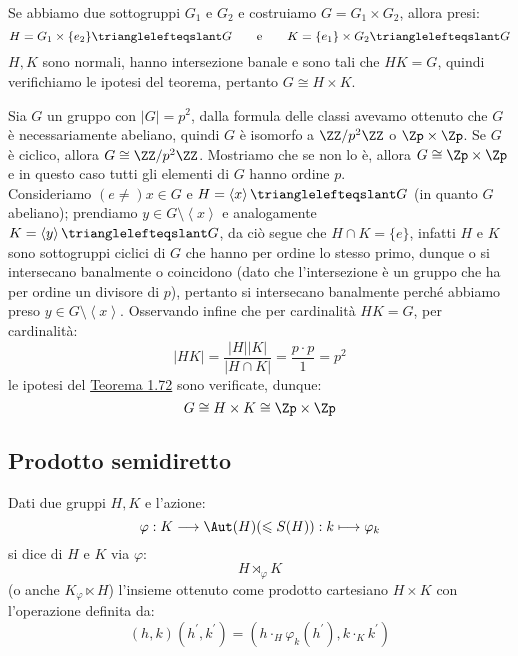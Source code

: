 \documentclass[11pt]{scrartcl}
\begin{document}
\begin{remark}
    Se abbiamo due sottogruppi $G_1$ e $G_2$ e costruiamo $G = G_1 \times G_2$, allora presi:
        \[ H = G_1 \times \{e_2\} \trianglelefteqslant G \qquad \text e \qquad K = \{e_1\} \times G_2 \trianglelefteqslant G
            \]
    $H,K$ sono normali, hanno intersezione banale e sono tali che $HK = G$, quindi verifichiamo le ipotesi del teorema, pertanto $G \cong H \times K$.
\end{remark}

\begin{example}
    Sia $G$ un gruppo con $|G| = p^2$, dalla formula delle classi avevamo ottenuto che $G$ è necessariamente abeliano, quindi $G$ è 
    isomorfo a $\ZZ/p^2\ZZ$ o $\Zp \times \Zp$. Se $G$ è ciclico, allora $G \cong \ZZ/p^2\ZZ$. Mostriamo che se non lo è, allora $G \cong \Zp \times \Zp$ e in 
    questo caso tutti gli elementi di $G$ hanno ordine $p$. \\
    Consideriamo $(e \ne) x \in G$ e $H = \left<x\right> \trianglelefteqslant G$ (in quanto $G$ abeliano); prendiamo $y \in G \setminus\left<x\right>$
    e analogamente $K = \left<y\right> \trianglelefteqslant G$, da ciò segue che $H \cap K = \{e\}$, infatti $H$ e $K$ sono sottogruppi ciclici di $G$
    che hanno per ordine lo stesso primo, dunque o si intersecano banalmente o coincidono (dato che l'intersezione è un gruppo che ha per ordine un divisore di $p$), pertanto si intersecano
    banalmente perché abbiamo preso $y \in G \setminus \left<x\right>$.
    Osservando infine che per cardinalità $HK = G$, per cardinalità:
        \[ |HK| = \frac{|H||K|}{|H \cap K|} = \frac{p\cdot p}{1} = p^2
            \]
    le ipotesi del \hyperref[t:1.72]{Teorema 1.72} sono verificate, dunque:
        \[ G \cong H \times K \cong \Zp \times \Zp
            \]
\end{example}

\newpage
\subsection{Prodotto semidiretto}

\begin{definition}
    Dati due gruppi $H,K$ e l'azione:
        \[ \varphi : K \longrightarrow \Aut(H) (\leqslant S(H)) : k \longmapsto \varphi_k
            \]
    si dice  di $H$ e $K$ via $\varphi$:
        \[ H \rtimes_{\varphi} K
            \]
    (o anche $K {_\varphi}\ltimes H$) l'insieme ottenuto come prodotto cartesiano $H \times K$ con l'operazione definita da:
        \[ (h,k) (h^{\prime},k^{\prime}) = (h \cdot_H \varphi_k(h^{\prime}), k \cdot_K k^{\prime})
            \]
\end{definition}
\end{document}

